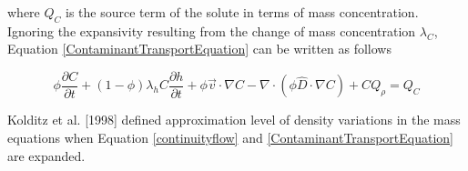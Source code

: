 where $Q_C$ is the source term of the solute in terms of mass
concentration. Ignoring the expansivity resulting from the change of
mass concentration $\lambda _C$, Equation
\ref{ContaminantTransportEquation} can be written as follows

\begin{equation}\label{ContaminantTransportExpandedEquation}
\phi \frac{{\partial C}}{{\partial t}} + \left( {1 - \phi }
\right)\lambda _h C\frac{{\partial h}}{{\partial t}} + \phi \vec v
\cdot \nabla C - \nabla  \cdot \left( {\phi \hat D \cdot \nabla C}
\right) + CQ_\rho   = Q_C
\end{equation}

Kolditz et al. [1998] defined approximation level of density
variations in the mass equations when Equation \ref{continuityflow}
and \ref{ContaminantTransportEquation} are expanded.


